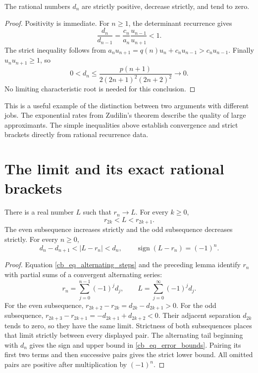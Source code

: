 \begin{lemma}\label{cb_lem_d_decrease}
The rational numbers $d_n$ are strictly positive, decrease strictly, and tend
to zero.
\end{lemma}

\begin{proof}
Positivity is immediate. For $n\geq1$, the determinant recurrence gives
\[
 \frac{d_n}{d_{n-1}}
 =\frac{c_n}{a_n}\frac{u_{n-1}}{u_{n+1}}<1.
\]
The strict inequality follows from
$a_nu_{n+1}=q(n)u_n+c_nu_{n-1}>c_nu_{n-1}$.
Finally $u_nu_{n+1}\geq1$, so
\[
 0<d_n\leq
 \frac{p(n+1)}{2(2n+1)^2(2n+2)^2}\longrightarrow0.
\]
No limiting characteristic root is needed for this conclusion.
\end{proof}

This is a useful example of the distinction between two arguments with
different jobs. The exponential rates from Zudilin's theorem describe the
quality of large approximants. The simple inequalities above establish
convergence and strict brackets directly from rational recurrence data.

\section{The limit and its exact rational brackets}

\begin{theorem}\label{cb_thm_brackets}
There is a real number $L$ such that $r_n\to L$. For every $k\geq0$,
\begin{equation}\label{cb_eq_bracket}
 r_{2k}<L<r_{2k+1}.
\end{equation}
The even subsequence increases strictly and the odd subsequence decreases
strictly. For every $n\geq0$,
\begin{equation}\label{cb_eq_error_bounds}
 d_n-d_{n+1}<|L-r_n|<d_n,
 \qquad \operatorname{sign}(L-r_n)=(-1)^n.
\end{equation}
\end{theorem}

\begin{proof}
Equation \eqref{cb_eq_alternating_steps} and the preceding lemma identify
$r_n$ with partial sums of a convergent alternating series:
\[
 r_n=\sum_{j=0}^{n-1}(-1)^j d_j,
 \qquad L=\sum_{j=0}^{\infty}(-1)^j d_j.
\]
For the even subsequence,
$r_{2k+2}-r_{2k}=d_{2k}-d_{2k+1}>0$.
For the odd subsequence,
$r_{2k+3}-r_{2k+1}=-d_{2k+1}+d_{2k+2}<0$.
Their adjacent separation $d_{2k}$ tends to zero, so they have the same limit.
Strictness of both subsequences places that limit strictly between every
displayed pair. The alternating tail beginning with $d_n$ gives the sign
and upper bound in \eqref{cb_eq_error_bounds}. Pairing its first two terms
and then successive pairs gives the strict lower bound. All omitted pairs
are positive after multiplication by $(-1)^n$.
\end{proof}

